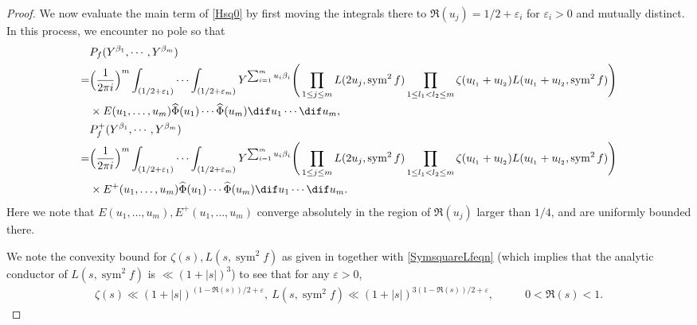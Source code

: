 \documentclass[twoside,leqno,10pt, A4]{amsart}
\begin{document}
\begin{proof}
  We now evaluate the main term of \eqref{Hsq0} by first moving the integrals there to $\Re(u_j)=1/2+\varepsilon_i$ for $\varepsilon_i>0$ and mutually distinct. In this process, we encounter no pole so that
\begin{align}
 \label{Hsq1}
\begin{split}& P_f(Y^{\beta_1}, \cdots, Y^{\beta_m})\\
=&\Big(\frac{1}{2\pi i}\Big)^{m}\int_{(1/2+\varepsilon_1)}\cdots\int_{(1/2+\varepsilon_m)}Y^{\sum^m_{i=1}u_i\beta_i}
\Bigg( \prod_{1 \leq j \leq m} L(2u_j, \operatorname{sym}^2f ) \prod_{1 \leq l_1 < l_2 \leq m} \zeta(u_{l_1} + u_{l_2})L (u_{l_1} + u_{l_2},\operatorname{sym}^2f)\Bigg) \\
&\times E(u_1, \ldots, u_{m})\widehat{\Phi}(u_1)\cdots\widehat{\Phi}(u_{m})\dif u_1\cdots \dif u_{m}, \\
& P^+_f(Y^{\beta_1}, \cdots, Y^{\beta_m})\\
=&\Big(\frac{1}{2\pi i}\Big)^{m}\int_{(1/2+\varepsilon_1)}\cdots\int_{(1/2+\varepsilon_m)}Y^{\sum^m_{i=1}u_i\beta_i}
\Bigg( \prod_{1 \leq j \leq m} L(2u_j, \operatorname{sym}^2f ) \prod_{1 \leq l_1 < l_2 \leq m} \zeta(u_{l_1} + u_{l_2})L (u_{l_1} + u_{l_2},\operatorname{sym}^2f)\Bigg) \\
&\times E^+(u_1, \ldots, u_{m})\widehat{\Phi}(u_1)\cdots\widehat{\Phi}(u_{m})\dif u_1\cdots \dif u_{m}.
\end{split}
\end{align}
  Here we note that $E(u_1, \ldots, u_{m}), E^+(u_1, \ldots, u_{m})$ converge absolutely in the region of $\Re(u_j)$ larger than $1/4$, and are uniformly bounded there.

  We note the convexity bound for $\zeta(s), L(s,\operatorname{sym}^2f)$ as given in \cite[(5.20)]{iwakow} together with \eqref{SymsquareLfeqn} (which implies that the analytic conductor of $L(s,\operatorname{sym}^2f)$ is $\ll (1+|s|)^3$) to see that for any $\varepsilon>0$,
\begin{align*}
   \zeta(s) \ll
   (1+|s|)^{(1-\Re(s))/2+\varepsilon}, \  L(s,\operatorname{sym}^2f) \ll
   (1+|s|)^{3(1-\Re(s))/2+\varepsilon},\qquad & 0< \Re(s) <1.
\end{align*}


\end{proof}
\end{document}
